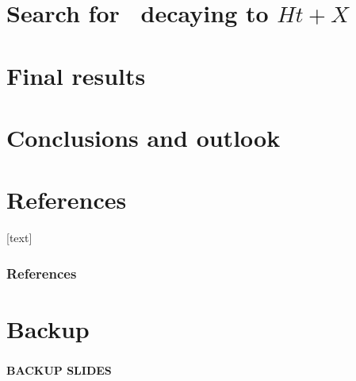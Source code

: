 \documentclass[xcolor=dvipsnames,10pt]{beamer}
\begin{document}
\section{Search for \TTbar\ decaying to $Ht+X$}

\section{Final results}

\section{Conclusions and outlook}


\appendix


\section*{References}
[text]

\begin{frame}[allowframebreaks]
\frametitle{References}\footnotesize

%

\end{frame}


\section*{Backup}

\begin{frame}
 \frametitle{}

\begin{center}{\bfseries
BACKUP SLIDES}
\end{center}
\end{frame}
\end{document}
